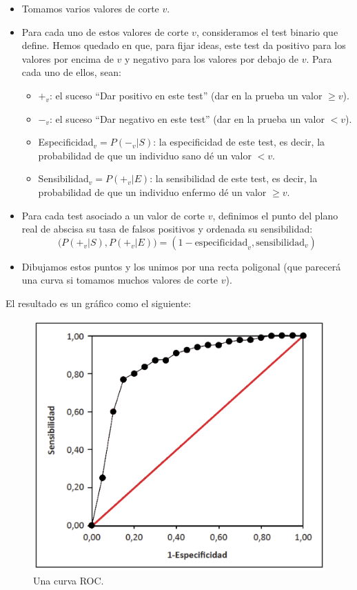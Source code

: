 \documentclass[
]{book}
\providecommand{\tightlist}{%
  \setlength{\itemsep}{0pt}\setlength{\parskip}{0pt}}
\theoremstyle{definition}
\theoremstyle{definition}
\theoremstyle{definition}
\theoremstyle{definition}
\theoremstyle{remark}
\begin{document}
\begin{itemize}
\item
  Tomamos varios valores de corte \(v\).
\item
  Para cada uno de estos valores de corte \(v\), consideramos el test binario que define. Hemos quedado en que, para fijar ideas, este test da positivo para los valores por encima de \(v\) y negativo para los valores por debajo de \(v\). Para cada uno de ellos, sean:

  \begin{itemize}
  \tightlist
  \item
    \(+_{v}\): el suceso ``Dar positivo en este test'' (dar en la prueba un valor \(\geqslant v\)).
  \item
    \(-_{v}\): el suceso ``Dar negativo en este test'' (dar en la prueba un valor \(< v\)).
  \item
    Especificidad\({}_{v} = P(-_{v}|S)\): la especificidad de este test, es decir, la probabilidad de que un individuo sano dé un valor \(< v\).
  \item
    Sensibilidad\({}_{v} = P(+_{v}|E)\): la sensibilidad de este test, es decir, la probabilidad de que un individuo enfermo dé un valor \(\geqslant v\).
  \end{itemize}
\item
  Para cada test asociado a un valor de corte \(v\), definimos el punto del plano real de abscisa su tasa de falsos positivos y ordenada su sensibilidad:
  \[
  \big(P(+_v|S),P(+_v|E)\big)=(1-\text{especificidad}_v,\text{sensibilidad}_v)
  \]
\item
  Dibujamos estos puntos y los unimos por una recta poligonal (que parecerá una curva si tomamos muchos valores de corte \(v\)).
\end{itemize}

El resultado es un gráfico como el siguiente:

\begin{figure}

{\centering \includegraphics[width=0.5\linewidth]{INREMDN_files/figure-html/roc1} 

}

\caption{Una curva ROC.}\label{fig:roc1}
\end{figure}
\end{document}
